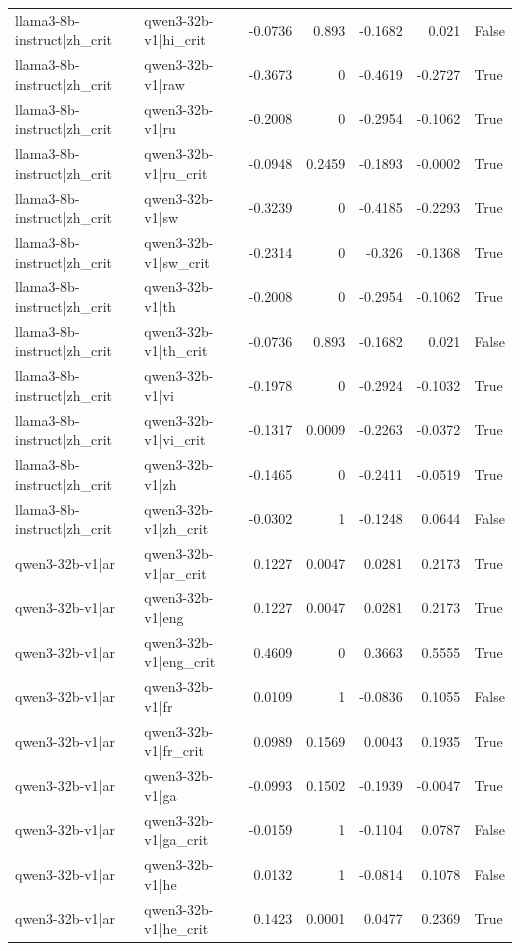 \begin{table}
\begin{tabular}{l l r r r r l}
llama3-8b-instruct|zh_crit & qwen3-32b-v1|hi_crit & -0.0736 & 0.893 & -0.1682 & 0.021 & False \\
llama3-8b-instruct|zh_crit & qwen3-32b-v1|raw & -0.3673 & 0 & -0.4619 & -0.2727 & True \\
llama3-8b-instruct|zh_crit & qwen3-32b-v1|ru & -0.2008 & 0 & -0.2954 & -0.1062 & True \\
llama3-8b-instruct|zh_crit & qwen3-32b-v1|ru_crit & -0.0948 & 0.2459 & -0.1893 & -0.0002 & True \\
llama3-8b-instruct|zh_crit & qwen3-32b-v1|sw & -0.3239 & 0 & -0.4185 & -0.2293 & True \\
llama3-8b-instruct|zh_crit & qwen3-32b-v1|sw_crit & -0.2314 & 0 & -0.326 & -0.1368 & True \\
llama3-8b-instruct|zh_crit & qwen3-32b-v1|th & -0.2008 & 0 & -0.2954 & -0.1062 & True \\
llama3-8b-instruct|zh_crit & qwen3-32b-v1|th_crit & -0.0736 & 0.893 & -0.1682 & 0.021 & False \\
llama3-8b-instruct|zh_crit & qwen3-32b-v1|vi & -0.1978 & 0 & -0.2924 & -0.1032 & True \\
llama3-8b-instruct|zh_crit & qwen3-32b-v1|vi_crit & -0.1317 & 0.0009 & -0.2263 & -0.0372 & True \\
llama3-8b-instruct|zh_crit & qwen3-32b-v1|zh & -0.1465 & 0 & -0.2411 & -0.0519 & True \\
llama3-8b-instruct|zh_crit & qwen3-32b-v1|zh_crit & -0.0302 & 1 & -0.1248 & 0.0644 & False \\
qwen3-32b-v1|ar & qwen3-32b-v1|ar_crit & 0.1227 & 0.0047 & 0.0281 & 0.2173 & True \\
qwen3-32b-v1|ar & qwen3-32b-v1|eng & 0.1227 & 0.0047 & 0.0281 & 0.2173 & True \\
qwen3-32b-v1|ar & qwen3-32b-v1|eng_crit & 0.4609 & 0 & 0.3663 & 0.5555 & True \\
qwen3-32b-v1|ar & qwen3-32b-v1|fr & 0.0109 & 1 & -0.0836 & 0.1055 & False \\
qwen3-32b-v1|ar & qwen3-32b-v1|fr_crit & 0.0989 & 0.1569 & 0.0043 & 0.1935 & True \\
qwen3-32b-v1|ar & qwen3-32b-v1|ga & -0.0993 & 0.1502 & -0.1939 & -0.0047 & True \\
qwen3-32b-v1|ar & qwen3-32b-v1|ga_crit & -0.0159 & 1 & -0.1104 & 0.0787 & False \\
qwen3-32b-v1|ar & qwen3-32b-v1|he & 0.0132 & 1 & -0.0814 & 0.1078 & False \\
qwen3-32b-v1|ar & qwen3-32b-v1|he_crit & 0.1423 & 0.0001 & 0.0477 & 0.2369 & True \\

\end{tabular}
\end{table}
